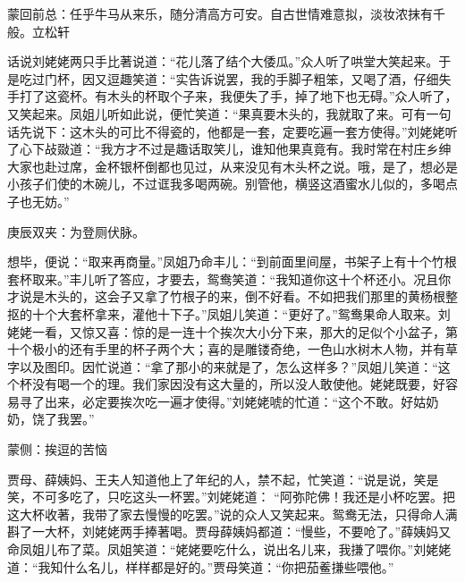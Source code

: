 
\begin{parag}
    \begin{note}蒙回前总：任乎牛马从来乐，随分清高方可安。自古世情难意拟，淡妆浓抹有千般。立松轩\end{note}
\end{parag}


\begin{parag}
    话说刘姥姥两只手比著说道：“花儿落了结个大倭瓜。”众人听了哄堂大笑起来。于是吃过门杯，因又逗趣笑道：“实告诉说罢，我的手脚子粗笨，又喝了酒，仔细失手打了这瓷杯。有木头的杯取个子来，我便失了手，掉了地下也无碍。”众人听了，又笑起来。凤姐儿听如此说，便忙笑道：“果真要木头的，我就取了来。可有一句话先说下：这木头的可比不得瓷的，他都是一套，定要吃遍一套方使得。”刘姥姥听了心下敁敠道：“我方才不过是趣话取笑儿，谁知他果真竟有。我时常在村庄乡绅大家也赴过席，金杯银杯倒都也见过，从来没见有木头杯之说。哦，是了，想必是小孩子们使的木碗儿，不过诓我多喝两碗。别管他，横竖这酒蜜水儿似的，多喝点子也无妨。”\begin{note}庚辰双夹：为登厕伏脉。\end{note}想毕，便说：“取来再商量。”凤姐乃命丰儿：“到前面里间屋，书架子上有十个竹根套杯取来。”丰儿听了答应，才要去，鸳鸯笑道：“我知道你这十个杯还小。况且你才说是木头的，这会子又拿了竹根子的来，倒不好看。不如把我们那里的黄杨根整抠的十个大套杯拿来，灌他十下子。”凤姐儿笑道：“更好了。”鸳鸯果命人取来。刘姥姥一看，又惊又喜：惊的是一连十个挨次大小分下来，那大的足似个小盆子，第十个极小的还有手里的杯子两个大；喜的是雕镂奇绝，一色山水树木人物，并有草字以及图印。因忙说道：“拿了那小的来就是了，怎么这样多？”凤姐儿笑道：“这个杯没有喝一个的理。我们家因没有这大量的，所以没人敢使他。姥姥既要，好容易寻了出来，必定要挨次吃一遍才使得。”刘姥姥唬的忙道：“这个不敢。好姑奶奶，饶了我罢。”\begin{note}蒙侧：挨逗的苦恼\end{note}贾母、薛姨妈、王夫人知道他上了年纪的人，禁不起，忙笑道：“说是说，笑是笑，不可多吃了，只吃这头一杯罢。”刘姥姥道： “阿弥陀佛！我还是小杯吃罢。把这大杯收著，我带了家去慢慢的吃罢。”说的众人又笑起来。鸳鸯无法，只得命人满斟了一大杯，刘姥姥两手捧著喝。贾母薛姨妈都道：“慢些，不要呛了。”薛姨妈又命凤姐儿布了菜。凤姐笑道：“姥姥要吃什么，说出名儿来，我搛了喂你。”刘姥姥道：“我知什么名儿，样样都是好的。”贾母笑道：“你把茄鲝搛些喂他。” 
\end{parag}
